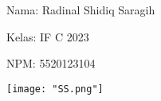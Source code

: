 \documentclass[12pt,a4paper]{article}
\date{}
\begin{document}
Nama: Radinal Shidiq Saragih

Kelas: IF C 2023

NPM: 5520123104

\begin{center}
  \texttt{[image: "SS.png"]}
\end{center}

%
\end{document}
